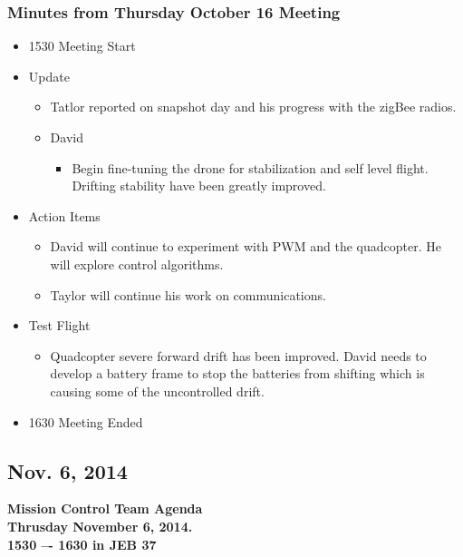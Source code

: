 \documentclass[pdftex,11pt]{article}
\begin{document}
\subsubsection[short]{Minutes from Thursday October 16 Meeting}
\begin{itemize}
	\item 1530 \indent Meeting Start
	\item Update
	\begin{itemize}
		\item  Tatlor reported on snapshot day and his progress with the zigBee radios.
		\item David
		\begin{itemize}
			\item Begin fine-tuning the drone for stabilization and self level flight.
	               Drifting stability have been greatly improved.
		\end{itemize}
	\end{itemize}
	
	\item Action Items
	\begin{itemize}
		\item David will continue to experiment with PWM and the quadcopter.   He will explore control algorithms.
		\item Taylor will continue his work on communications.
	\end{itemize}
	\item Test Flight
	\begin{itemize}
		\item  Quadcopter severe forward drift has been improved. David needs to develop a battery frame to stop the batteries from shifting which is causing some of the uncontrolled drift.
	\end{itemize}
	\item 1630 \indent Meeting Ended
\end{itemize}	


\clearpage


\subsection{Nov. 6, 2014}
{ \huge \bfseries Mission Control Team Agenda \\[0.4cm] }
{ \huge \bfseries Thrusday November 6, 2014.\\1530 –-  1630  in JEB 37\\[0.4cm] }
\vspace*{2.5mm}
\end{document}
